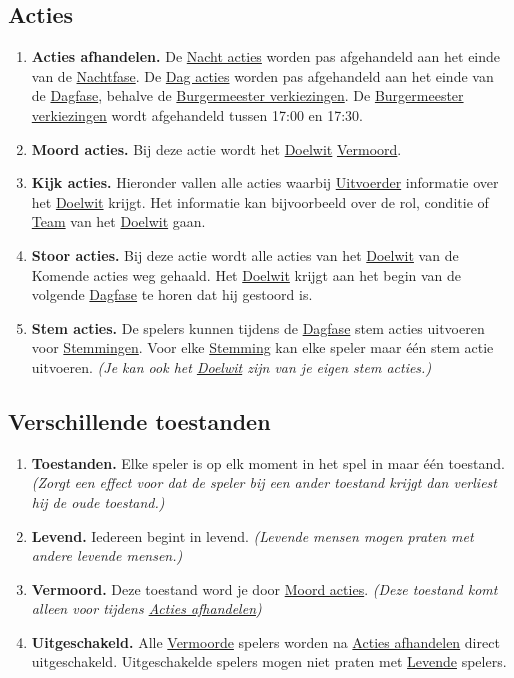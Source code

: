 \documentclass{article}
\newenvironment{rulesubsection}[1]{
    \subsection{#1} \label{rule:#1}
    \begin{enumerate}[label=\thesubsection.\arabic{enumi}]
}{
    \end{enumerate}
}
\newcommand{\ruleitem}[1]{\item \label{rule:#1} \textbf{#1.}}
\newcommand{\ruleref}[1]{\hyperref[rule:#1]{#1}}
\begin{document}
\begin{rulesubsection}{Acties}
    \ruleitem{Acties afhandelen} De \ruleref{Nacht acties} worden pas afgehandeld aan het einde van de \ruleref{Nachtfase}.
    De \ruleref{Dag acties} worden pas afgehandeld aan het einde van de \ruleref{Dagfase}, behalve de \ruleref{Burgermeester verkiezingen}.
    De \ruleref{Burgermeester verkiezingen} wordt afgehandeld tussen 17:00 en 17:30.
    \ruleitem{Moord acties} Bij deze actie wordt het \ruleref{Doelwit} \ruleref{Vermoord}.
    \ruleitem{Kijk acties} Hieronder vallen alle acties waarbij \ruleref{Uitvoerder} informatie over het \ruleref{Doelwit} krijgt.
    Het informatie kan bijvoorbeeld over de rol, conditie of \hyperref[rule:Teams]{Team} van het \ruleref{Doelwit} gaan.
    \ruleitem{Stoor acties} Bij deze actie wordt alle acties van het \ruleref{Doelwit} van de Komende acties weg gehaald.
    Het \ruleref{Doelwit} krijgt aan het begin van de volgende \ruleref{Dagfase} te horen dat hij gestoord is.
    \ruleitem{Stem acties} De spelers kunnen tijdens de \ruleref{Dagfase} stem acties uitvoeren voor \ruleref{Stemmingen}. 
    Voor elke \hyperref[rule:Stemmingen]{Stemming} kan elke speler maar één stem actie uitvoeren. \textit{(Je kan ook het \ruleref{Doelwit} zijn van je eigen stem acties.)} 
\end{rulesubsection}

\begin{rulesubsection}{Verschillende toestanden}
    \ruleitem{Toestanden} Elke speler is op elk moment in het spel in maar één toestand. 
    \textit{(Zorgt een effect voor dat de speler bij een ander toestand krijgt dan verliest hij de oude toestand.)}
    \ruleitem{Levend} Iedereen begint in levend. \textit{(Levende mensen mogen praten met andere levende mensen.)}
    \ruleitem{Vermoord} Deze toestand word je door \ruleref{Moord acties}. \textit{(Deze toestand komt alleen voor tijdens \ruleref{Acties afhandelen})}
    \ruleitem{Uitgeschakeld} Alle \hyperref[rule:Vermoord]{Vermoorde} spelers worden na \ruleref{Acties afhandelen} direct uitgeschakeld.
    Uitgeschakelde spelers mogen niet praten met \hyperref[rule:Levend]{Levende} spelers.
\end{rulesubsection}
\end{document}
